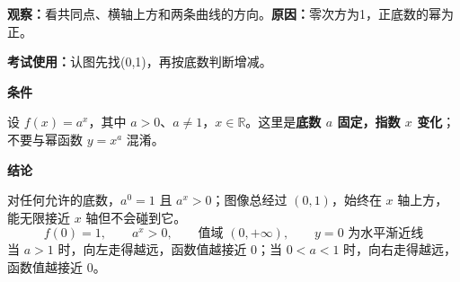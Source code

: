 \begin{statementbox}

\textbf{观察：}看共同点、横轴上方和两条曲线的方向。\quad\textbf{原因：}零次方为1，正底数的幂为正。

\textbf{考试使用：}认图先找(0,1)，再按底数判断增减。



\textbf{\textcolor{CStatement}{条件}}
\begin{description}[style=nextline, leftmargin=2.8em, labelsep=0.5em, itemsep=0.35em]
    \item[\textbf{\textcolor{CStatement}{底数与定义域：}}]
    设 $f(x)=a^x$，其中 $a>0$、$a\neq1$，$x\in\mathbb R$。这里是\textbf{底数 $a$ 固定，指数 $x$ 变化}；不要与幂函数 $y=x^a$ 混淆。
\end{description}

\textbf{\textcolor{CStatement}{结论}}
\begin{description}[style=nextline, leftmargin=2.8em, labelsep=0.5em, itemsep=0.45em]
    \item[\textbf{\textcolor{CStatement}{结论一（正值、定点、值域与渐近线）：}}]
    对任何允许的底数，$a^0=1$ 且 $a^x>0$；图像总经过 $(0,1)$，始终在 $x$ 轴上方，能无限接近 $x$ 轴但不会碰到它。
    \[
        \boxed{\ f(0)=1,\qquad a^x>0,\qquad \text{值域 }(0,+\infty),\qquad y=0\text{ 为水平渐近线}\ }
    \]
    当 $a>1$ 时，向左走得越远，函数值越接近 $0$；当 $0<a<1$ 时，向右走得越远，函数值越接近 $0$。

\end{description}
\end{statementbox}
\clearpage
